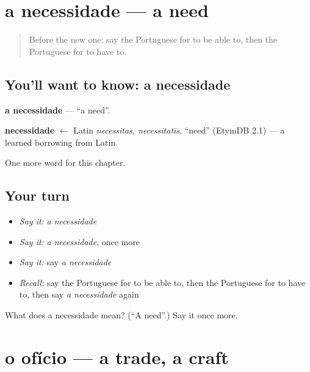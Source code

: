 \section[a necessidade]{a necessidade — a need}

\label{lesson:PT-C82-necessidade}



\begin{quote}
Before the new one: say the Portuguese for to be able to, then the Portuguese for to have to.
\end{quote}

\subsection*{You'll want to know: a necessidade}
\textbf{a necessidade} — \textquotedblleft{}a need\textquotedblright{}.

\begin{cousinweb}
\textbf{necessidade} $\leftarrow$ Latin \emph{necessitas, necessitatis}, \textquotedblleft{}need\textquotedblright{} (EtymDB 2.1) — a learned borrowing from Latin.
\end{cousinweb}

\begin{grammarlens}[title={What you've built}]
One more word for this chapter.
\end{grammarlens}

\subsection*{Your turn}
\begin{itemize}
\raggedright
  \item \emph{Say it:} \emph{a necessidade}
  \item \emph{Say it:} \emph{a necessidade}, once more
  \item \emph{Say it:} say \emph{a necessidade}
  \item \emph{Recall:} say the Portuguese for to be able to, then the Portuguese for to have to, then say \emph{a necessidade} again
\end{itemize}

\begin{tcolorbox}[breakable,colback=teal!4,colframe=teal!35!black,title={Before you move on}]
What does a necessidade mean? (\textquotedblleft{}A need\textquotedblright{}.) Say it once more.
\end{tcolorbox}
\section[o ofício]{o ofício — a trade, a craft}

